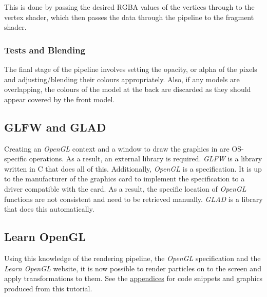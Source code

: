 \documentclass[12pt]{article}
\begin{document}
    This is done by passing the desired RGBA values of the vertices through to the vertex shader, which then passes the data through the pipeline to the fragment shader.

    \subsubsection{Tests and Blending}

    The final stage of the pipeline involves setting the opacity, or alpha of the pixels and adjusting/blending their colours appropriately. Also, if any models are overlapping, the colours of the model at the back are discarded as they should appear covered by the front model.

    \subsection{GLFW and GLAD}

    Creating an \textit{OpenGL} context and a window to draw the graphics in are OS-specific operations. As a result, an external library is required. \textit{GLFW}\cite{glfw} is a library written in C that does all of this. Additionally, \textit{OpenGL} is a specification. It is up to the manufacturer of the graphics card to implement the specification to a driver compatible with the card. As a result, the specific location of \textit{OpenGL} functions are not consistent and need to be retrieved manually. \textit{GLAD}\cite{glad} is a library that does this automatically.

    \subsection{Learn OpenGL}

    Using this knowledge of the rendering pipeline, the \textit{OpenGL} specification and the \textit{Learn OpenGL} website, it is now possible to render particles on to the screen and apply transformations to them. See the \hyperref[sec:appendices]{appendices} for code snippets and graphics produced from this tutorial. 
    
\end{document}
